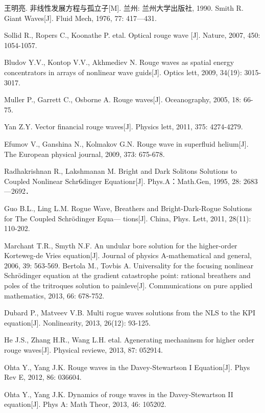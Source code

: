 \begin{thebibliography}{0}
王明亮. 非线性发展方程与孤立子[M]. 兰州: 兰州大学出版社, 1990.
Smith R. Giant Waves[J]. Fluid Mech, 1976, 77: 417—431.

Sollid R., Ropers C., Koonathe P. etal. Optical rouge wave [J]. Nature, 2007, 450: 1054-1057.

 Bludov Y.V., Kontop V.V., Akhmediev N. Rouge waves as spatial energy concentrators in arrays of nonlinear wave guids[J]. Optics lett, 2009, 34(19): 3015-3017.

Muller P., Garrett C., Osborne A. Rouge waves[J]. Oceanography, 2005, 18: 66-75.

 Yan Z.Y. Vector financial rouge waves[J]. Physics lett, 2011, 375: 4274-4279.

Efumov V., Ganshina N., Kolmakov G.N. Rouge wave in superfluid helium[J]. The European physical journal, 2009, 373: 675-678.

Radhakrishnan R., Lakshmanan M. Bright and Dark Solitons Solutions to Coupled Nonlinear Schr6dinger Equationr[J]. Phys.A：Math.Gen, 1995, 28: 2683—2692．

Guo B.L., Ling L.M. Rogue Wave, Breathers and Bright-Dark-Rogue Solutions for The Coupled Schr\"{o}dinger Equa—   
tions[J]. China, Phys. Lett, 2011, 28(11): 110-202.

Marchant T.R., Smyth N.F. An undular bore solution for the higher-order Korteweg-de Vries equation[J]. Journal of physics A-mathematical and general, 2006, 39: 563-569.
 Bertola M., Tovbis A. Universality for the focusing nonlinear Schr\"{o}dinger equation at the gradient catastrophe point: rational breathers and poles of the tritroques solution to painleve[J]. Communications on pure applied mathematics, 2013, 66: 678-752.

Dubard P., Matveev V.B. Multi rogue waves solutions from the NLS to the KPI equation[J]. Nonlinearity, 2013, 26(12): 93-125.

 He J.S., Zhang H.R., Wang L.H. etal. Agenerating mechaninsm for higher order rouge waves[J]. Physical reviewe, 2013, 87: 052914.

Ohta Y., Yang J.K. Rouge waves in the Davey-Stewartson I Equation[J]. Phys Rev E, 2012, 86: 036604.

Ohta Y., Yang J.K. Dynamics of rouge waves in the Davey-Stewartson II equation[J]. Phys A: Math Theor, 2013, 46: 105202.


\end{thebibliography}
